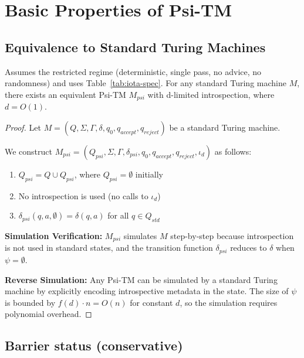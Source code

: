   \section{Basic Properties of Psi-TM}
  
  \subsection{Equivalence to Standard Turing Machines}
  
  \begin{theorem}
  Assumes the restricted regime (deterministic, single pass, no advice, no randomness) and uses Table~\ref{tab:iota-spec}.
  For any standard Turing machine $M$, there exists an equivalent Psi-TM $M_{psi}$ with d-limited introspection, where $d = O(1)$.
  \end{theorem}
  
  \begin{proof}
  Let $M = (Q, \Sigma, \Gamma, \delta, q_0, q_{accept}, q_{reject})$ be a standard Turing machine.
  
  We construct $M_{psi} = (Q_{psi}, \Sigma, \Gamma, \delta_{psi}, q_0, q_{accept}, q_{reject}, \iota_d)$ as follows:
  
  \begin{enumerate}
  \item $Q_{psi} = Q \cup Q_{psi}$, where $Q_{psi} = \emptyset$ initially
  \item No introspection is used (no calls to $\iota_d$)
  \item $\delta_{psi}(q, a, \emptyset) = \delta(q, a)$ for all $q \in Q_{std}$
  \end{enumerate}
  
  \textbf{Simulation Verification:} 
  $M_{psi}$ simulates $M$ step-by-step because introspection is not used in standard states, and the transition function $\delta_{psi}$ reduces to $\delta$ when $\psi = \emptyset$.
  
  \textbf{Reverse Simulation:}
  Any Psi-TM can be simulated by a standard Turing machine by explicitly encoding introspective metadata in the state. The size of $\psi$ is bounded by $f(d) \cdot n = O(n)$ for constant $d$, so the simulation requires polynomial overhead.
  \end{proof}
  
  \subsection{Barrier status (conservative)}
  
